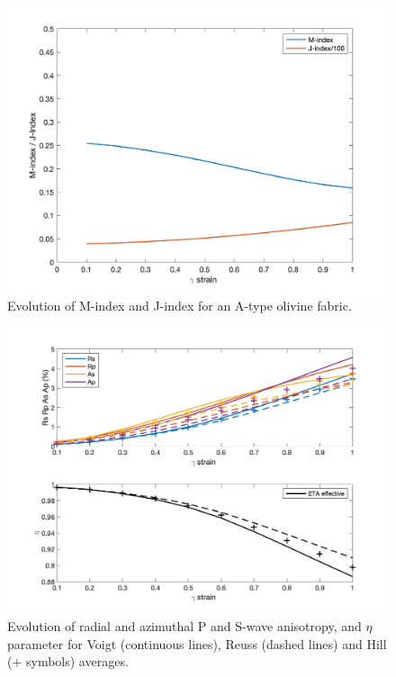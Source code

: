 \begin{figure}[ht]
    \centering
    \includegraphics[width=1.0\textwidth]{DREX_S/MI_JI_Atype_.png}
    \caption{Evolution of M-index and J-index for an A-type olivine fabric.}
    \label{fig:miji}
\end{figure}

\begin{figure}[ht]
    \centering
    \includegraphics[width=1.0\textwidth]{DREX_S/AziRad.png}
    \caption{Evolution of radial and azimuthal P and S-wave anisotropy, and $\eta$ parameter for Voigt (continuous lines), Reuss (dashed lines) and Hill (+ symbols) averages.}
    \label{fig:azirad}
\end{figure}

